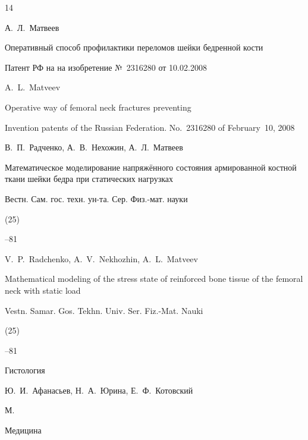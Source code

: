 \begin{thebibliography}{14}




\by А.~Л.~Матвеев

\thesis Оперативный способ профилактики переломов шейки бедренной кости

\thesisinfo Патент РФ на на изобретение №~2316280 от 10.02.2008

\misctransl

\by A.~L.~Matveev

\thesis Operative way of femoral neck fractures preventing

\thesisinfo Invention patents of the Russian Federation. No.~2316280 of February~10, 2008




\by В.~П.~Радченко, А.~В.~Нехожин, А.~Л.~Матвеев

\paper Математическое моделирование напряжённого состояния армированной костной ткани шейки бедра при статических нагрузках

\jour Вестн. Сам. гос. техн. ун-та. Сер. Физ.-мат. науки


(25)

--81


\misctransl

\by V.~P.~Radchenko, A.~V.~Nekhozhin, A.~L.~Matveev

\paper Mathematical modeling of the stress state of reinforced bone tissue of the femoral neck with static load

\jour Vestn. Samar. Gos. Tekhn. Univ. Ser. Fiz.-Mat. Nauki


(25)

--81






\book Гистология

\by Ю.~И.~Афанасьев, Н.~А.~Юрина, Е.~Ф.~Котовский

\publaddr М.

\publ Медицина



\misctransl


\end{thebibliography}

